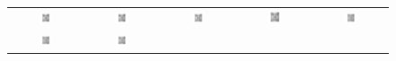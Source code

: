 \documentclass[ss]{imsart}
\theoremstyle{Example}
\begin{document}
 \begin{figure}
\begin{center}
\begin{tabular}{ccccc}
\includegraphics[width=0.19\textwidth]{./RobustPCA_Figures/Yale28_Orig_FullImage} &
\includegraphics[width=0.19\textwidth]{./RobustPCA_Figures/Yale28_Orig_PC10_Classical} &
\includegraphics[width=0.19\textwidth]{./RobustPCA_Figures/Yale28_Orig_PC10_WSign} &
\includegraphics[width=0.19\textwidth]{./RobustPCA_Figures/Yale28_Orig_PC10_RP1} &
\includegraphics[width=0.19\textwidth]{./RobustPCA_Figures/Yale28_Orig_PC10_MatDec1} 
\\
\includegraphics[width=0.19\textwidth]{./RobustPCA_Figures/Yale28_Orig_PC10_MatDec2} &
\includegraphics[width=0.19\textwidth]{./RobustPCA_Figures/Yale28_Orig_PC10_H2} &

\end{tabular}
\end{center}
\end{figure}
\end{document}
